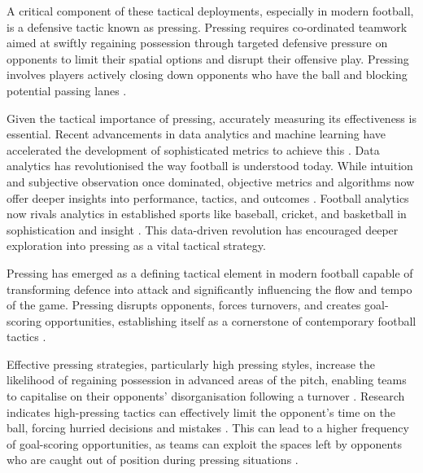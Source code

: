 \citep{forcher_success_2023, low_defending_2022}

A critical component of these tactical deployments, especially in modern football, is a defensive tactic known as pressing. Pressing requires co-ordinated teamwork aimed at swiftly regaining possession through targeted defensive pressure on opponents to limit their spatial options and disrupt their offensive play. Pressing involves players actively closing down opponents who have the ball and blocking potential passing lanes \citep{borbely_all_2018}.

Given the tactical importance of pressing, accurately measuring its effectiveness is essential. Recent advancements in data analytics and machine learning have accelerated the development of sophisticated metrics to achieve this \citep{link_data_2018, memmert_data_2018, rein_big_2016, rico-gonzalez_markel_machine_2023}. Data analytics has revolutionised the way football is understood today. While intuition and subjective observation once dominated, objective metrics and algorithms now offer deeper insights into performance, tactics, and outcomes \citep{memmert_data_2018}. Football analytics now rivals analytics in established sports like baseball, cricket, and basketball in sophistication and insight \citep{herold_machine_2019, rico-gonzalez_markel_machine_2023}. This data-driven revolution has encouraged deeper exploration into pressing as a vital tactical strategy.

Pressing has emerged as a defining tactical element in modern football capable of transforming defence into attack and significantly influencing the flow and tempo of the game. Pressing disrupts opponents, forces turnovers, and creates goal-scoring opportunities, establishing itself as a cornerstone of contemporary football tactics \citep{robberechts_valuing_2019}.

Effective pressing strategies, particularly high pressing styles, increase the likelihood of regaining possession in advanced areas of the pitch, enabling teams to capitalise on their opponents' disorganisation following a turnover \citep{brindescu_study_2021, fernandez-navarro_evaluating_2019, modric_influence_2023}. Research indicates high-pressing tactics can effectively limit the opponent's time on the ball, forcing hurried decisions and mistakes \citep{forcher_is_2023, low_porous_2021}. This can lead to a higher frequency of goal-scoring opportunities, as teams can exploit the spaces left by opponents who are caught out of position during pressing situations \citep{cooper_impact_2020, fernandes_how_2020}.

